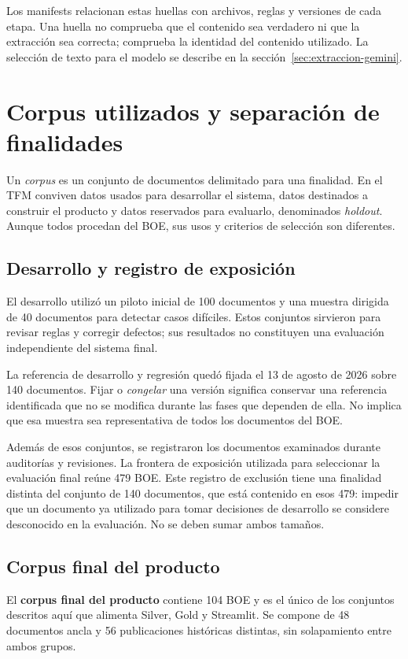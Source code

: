 Los manifests relacionan estas huellas con archivos, reglas y versiones de
cada etapa. Una huella no comprueba que el contenido sea verdadero ni que la
extracción sea correcta; comprueba la identidad del contenido utilizado. La
selección de texto para el modelo se describe en la
sección~\ref{sec:extraccion-gemini}.

\section{Corpus utilizados y separación de finalidades}
\label{sec:corpus-utilizados}
Un \emph{corpus} es un conjunto de documentos delimitado para una finalidad.
En el TFM conviven datos usados para desarrollar el sistema, datos destinados
a construir el producto y datos reservados para evaluarlo, denominados \emph{holdout}. Aunque todos
procedan del BOE, sus usos y criterios de selección son diferentes.

\subsection{Desarrollo y registro de exposición}
El desarrollo utilizó un piloto inicial de 100 documentos y una muestra
dirigida de 40 documentos para detectar casos difíciles. Estos conjuntos
sirvieron para revisar reglas y corregir defectos; sus resultados no
constituyen una evaluación independiente del sistema final.

La referencia de desarrollo y regresión quedó fijada el 13 de agosto de
2026 sobre 140 documentos. Fijar o \emph{congelar} una versión significa
conservar una referencia identificada que no se modifica durante las fases
que dependen de ella. No implica que esa muestra sea representativa de todos
los documentos del BOE.

Además de esos conjuntos, se registraron los documentos examinados durante
auditorías y revisiones. La frontera de exposición utilizada para seleccionar
la evaluación final reúne 479 BOE. Este registro de exclusión tiene una
finalidad distinta del conjunto de 140 documentos, que está contenido en esos
479: impedir que un documento
ya utilizado para tomar decisiones de desarrollo se considere desconocido
en la evaluación. No se deben sumar ambos tamaños.

\subsection{Corpus final del producto}
El \textbf{corpus final del producto} contiene 104 BOE y es el único de los
conjuntos descritos aquí que alimenta Silver, Gold y Streamlit. Se compone de
48 documentos ancla y 56 publicaciones históricas distintas, sin solapamiento
entre ambos grupos.

